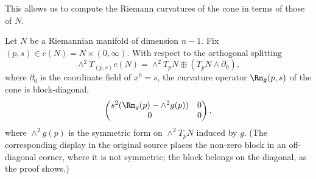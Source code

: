 This allows us to compute the Riemann curvatures of the cone in
terms of those of $N$.

\begin{proposition}
\label{prop:cone-curvature}
\label{conecurv}
Let $N$ be a Riemannian manifold of dimension $n-1$. Fix $(p,s)\in
c(N)=N\times (0,\infty)$. With respect to the orthogonal splitting
$$\wedge^2T_{(p,s)}c(N)=\wedge^2T_pN\oplus
\left(T_pN\wedge\partial_0\right),$$
where $\partial_0$ is the coordinate field of $x^0=s$, the curvature
operator $\Rm_{\tilde g}(p,s)$ of the cone is block-diagonal,
$$\begin{pmatrix} s^2(\Rm_g(p)-\wedge^2g(p)) & 0 \\ 0 & 0
\end{pmatrix},$$
where $\wedge^2g(p)$ is the symmetric form on $\wedge^2T_pN$ induced
by $g$. (The corresponding display in the original source places
the non-zero block in an off-diagonal corner, where it is not
symmetric; the block belongs on the diagonal, as the proof shows.)
\end{proposition}

